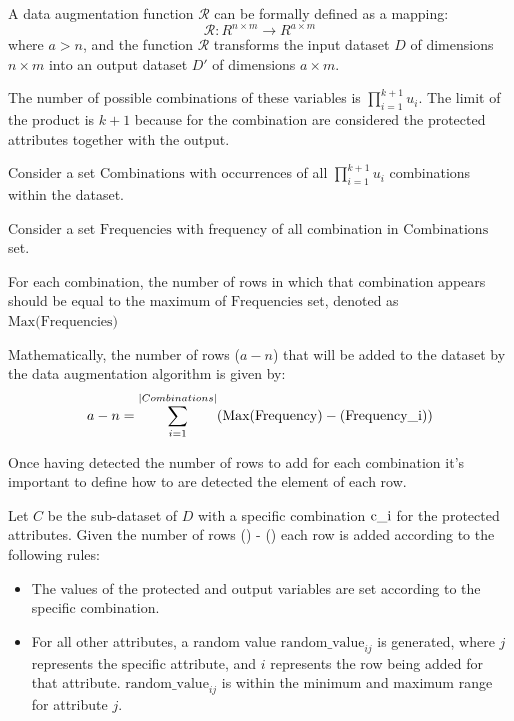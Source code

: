 A data augmentation function $\mathcal{R}$ can be formally defined as a mapping:
\[
\mathcal{R}: R^{n \times m} \rightarrow R^{a \times m}
\]
where $a > n$, and the function $\mathcal{R}$ transforms the input dataset $D$ of dimensions $n \times m$ into an output dataset $D'$ of dimensions $a \times m$.

The number of possible combinations of these variables is $\prod_{i=1}^{k+1} u_i$. The limit of the product is ${k + 1}$ because for the combination are considered the protected attributes together with the output.

Consider a set $\text{Combinations}$ with occurrences of all $\prod_{i=1}^{k+1} u_i$ combinations within the dataset. 

Consider a set $\text{Frequencies}$ with frequency of all combination in $\text{Combinations}$ set.

For each combination, the number of rows in which that combination appears should be equal to the maximum of $\text{Frequencies}$ set, denoted as $\text{Max(Frequencies)}$

Mathematically, the number of rows ($a - n$) that will be added to the dataset by the data augmentation algorithm is given by:
\[
a - n = \sum_{i=1}^{|Combinations|}(\text{Max}(\text{Frequency}) - (\text{Frequency\textunderscore i}))
\]

Once having detected the number of rows to add for each combination it's important to define how to are detected the element of each row.

Let $C$ be the sub-dataset of $D$ with a specific combination $\text{c\textunderscore i}$ for the protected attributes. Given the number of rows () - () each row is added according to the following rules:

\begin{itemize}
    
    \item The values of the protected and output variables are set according to the specific combination.
   
    \item For all other attributes, a random value $\text{random\_value}_{ij}$ is generated, where $j$ represents the specific attribute, and $i$ represents the row being added for that attribute. $\text{random\_value}_{ij}$ is within the minimum and maximum range for attribute $j$.

\end{itemize}

